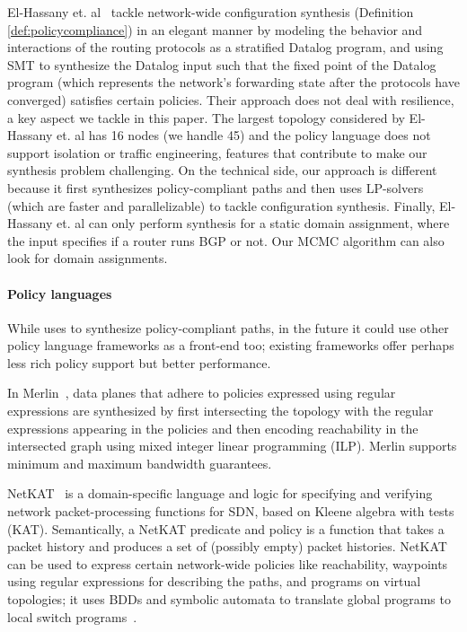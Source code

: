 El-Hassany et. al~\cite{synet} tackle network-wide configuration
synthesis (Definition \ref{def:policycompliance}) in an elegant manner by
modeling the behavior and interactions of the routing protocols as a
stratified Datalog program, and using SMT to synthesize the Datalog
input such that the fixed point of the Datalog program (which
represents the network's forwarding state after the protocols have
converged) satisfies certain policies.  
Their approach does not deal with resilience, a key aspect we tackle 
in this paper.
The
largest topology considered by El-Hassany et. al has 16 nodes (we handle 45)
and the policy language does not support isolation or
traffic engineering, 
features that contribute to make our synthesis problem challenging.  
On the technical side, our approach is different because
it first   synthesizes policy-compliant paths and then uses
LP-solvers (which are faster and parallelizable) to tackle configuration
synthesis.  
Finally, El-Hassany et. al can only perform synthesis for a
static domain assignment, where the input specifies if a router runs
BGP or not. Our MCMC algorithm can also look for domain assignments.

%

\paragraph{Policy languages} While \name uses \genesis 
to synthesize policy-compliant paths, in the future it could use
other policy language frameworks as a front-end
too; existing frameworks offer perhaps less rich policy support but better
performance. %

In Merlin~\cite{merlin}, data planes that adhere to policies expressed
using regular expressions are synthesized by first intersecting the
topology with the regular expressions appearing in the policies and
then encoding reachability in the intersected graph using mixed
integer linear programming (ILP).  Merlin supports minimum and maximum
bandwidth guarantees.

NetKAT~\cite{netkat} is a domain-specific language and logic for 
specifying and verifying network packet-processing functions
for SDN, based on Kleene algebra with tests (KAT). Semantically,
a NetKAT predicate and policy is a function that takes a packet
history and produces a set of (possibly empty) packet histories. 
NetKAT can be used to express certain network-wide policies like 
reachability, waypoints using regular expressions for describing the paths, 
and programs on virtual topologies; it uses
BDDs and symbolic automata to translate global programs to local
switch programs~\cite{netkatcompiler}.

